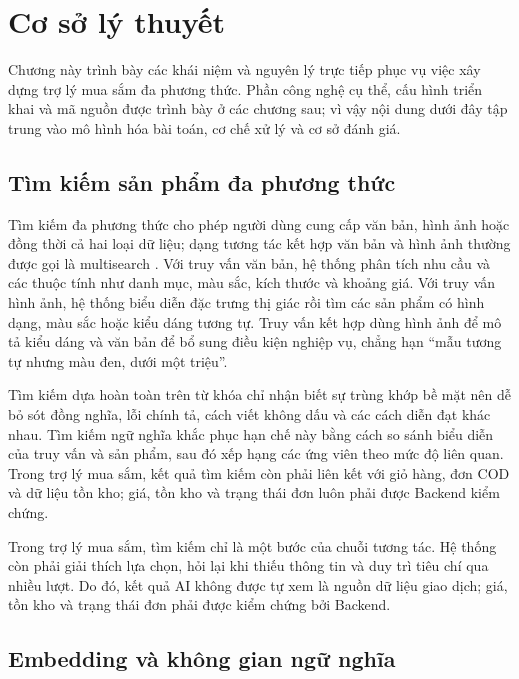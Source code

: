 
\section{Cơ sở lý thuyết}

Chương này trình bày các khái niệm và nguyên lý trực tiếp phục vụ việc xây dựng trợ lý
mua sắm đa phương thức. Phần công nghệ cụ thể, cấu hình triển khai và mã nguồn được
trình bày ở các chương sau; vì vậy nội dung dưới đây tập trung vào mô hình hóa bài toán,
cơ chế xử lý và cơ sở đánh giá.

\subsection{Tìm kiếm sản phẩm đa phương thức}

Tìm kiếm đa phương thức cho phép người dùng cung cấp văn bản, hình ảnh hoặc đồng thời
cả hai loại dữ liệu; dạng tương tác kết hợp văn bản và hình ảnh thường được gọi là
multisearch \parencite{google2022multisearch}. Với truy vấn văn bản, hệ thống phân tích
nhu cầu và các thuộc tính như danh mục, màu sắc, kích thước và khoảng giá. Với truy vấn
hình ảnh, hệ thống biểu diễn đặc trưng thị giác rồi tìm các sản phẩm có hình dạng, màu
sắc hoặc kiểu dáng tương tự. Truy vấn kết hợp dùng hình ảnh để mô tả kiểu dáng và văn
bản để bổ sung điều kiện nghiệp vụ, chẳng hạn ``mẫu tương tự nhưng màu đen, dưới một
triệu''.

Tìm kiếm dựa hoàn toàn trên từ khóa chỉ nhận biết sự trùng khớp bề mặt nên dễ bỏ sót
đồng nghĩa, lỗi chính tả, cách viết không dấu và các cách diễn đạt khác nhau. Tìm kiếm
ngữ nghĩa khắc phục hạn chế này bằng cách so sánh biểu diễn của truy vấn và sản phẩm,
sau đó xếp hạng các ứng viên theo mức độ liên quan. Trong trợ lý mua sắm, kết quả tìm
kiếm còn phải liên kết với giỏ hàng, đơn COD và dữ liệu tồn kho; giá, tồn kho và trạng
thái đơn luôn phải được Backend kiểm chứng.

Trong trợ lý mua sắm, tìm kiếm chỉ là một bước của chuỗi tương tác. Hệ thống còn phải
giải thích lựa chọn, hỏi lại khi thiếu thông tin và duy trì tiêu chí qua nhiều lượt. Do đó,
kết quả AI không được
tự xem là nguồn dữ liệu giao dịch; giá, tồn kho và trạng thái đơn phải được kiểm chứng
bởi Backend.

\subsection{Embedding và không gian ngữ nghĩa}

